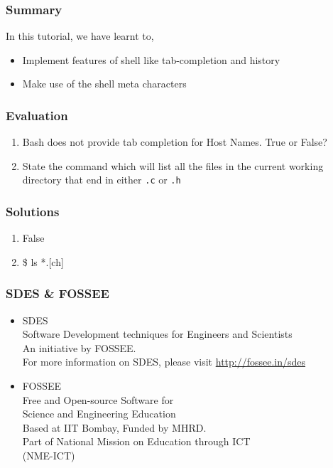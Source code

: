 \documentclass[17pt,compress]{beamer}
\begin{document}
\begin{frame}
\frametitle{Summary}
\label{sec-8}

  In this tutorial, we have learnt to,


\begin{itemize}
\item Implement features of shell like tab-completion and history
\item Make use of the shell meta characters
\end{itemize}
\end{frame}
\begin{frame}[fragile]
\frametitle{Evaluation}
\label{sec-9}


\begin{enumerate}
\item Bash does not provide tab completion for Host Names. True or False? 
\vspace{12pt}
\item State the command which will list all the files in the current working
      directory that end in either \verb~.c~ or \verb~.h~
\end{enumerate}
\end{frame}
\begin{frame}
\frametitle{Solutions}
\label{sec-10}


\begin{enumerate}
\item False
\vspace{15pt}
\item \$ ls *.[ch]
\end{enumerate}
\end{frame}

\begin{frame}
\frametitle{SDES \& FOSSEE}
\begin{center}
\begin{itemize}
\item \small{SDES}\\
\small{\color{LimeGreen}Software Development techniques for Engineers and Scientists} \\
\scriptsize An initiative by FOSSEE. \\
\vspace{3pt}
\scriptsize For more information on SDES, please visit {\color{blue}\url{http://fossee.in/sdes}}\\
\vspace{10pt}
\item \small{FOSSEE}\\
\small {\color{LimeGreen}Free and Open-source Software for \\Science and Engineering Education} \\
\scriptsize Based at IIT Bombay, Funded by MHRD.\\
\vspace{3pt}
\scriptsize Part of National Mission on Education through ICT \\(NME-ICT) \\
\end{itemize}
\end{center}
\end{frame}
\end{document}
